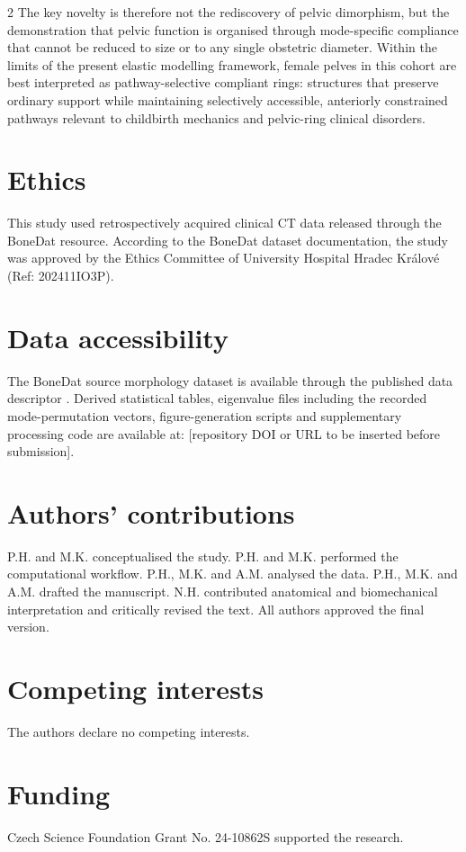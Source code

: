 \documentclass[openacc]{rsproca_new}
\begin{document}
\begin{multicols}{2}
The key novelty is therefore not the rediscovery of pelvic dimorphism, but the demonstration that pelvic function is organised through mode-specific compliance that cannot be reduced to size or to any single obstetric diameter. Within the limits of the present elastic modelling framework, female pelves in this cohort are best interpreted as pathway-selective compliant rings: structures that preserve ordinary support while maintaining selectively accessible, anteriorly constrained pathways relevant to childbirth mechanics and pelvic-ring clinical disorders.

\section*{Ethics}

This study used retrospectively acquired clinical CT data released through the BoneDat resource. According to the BoneDat dataset documentation, the study was approved by the Ethics Committee of University Hospital Hradec Kr\'{a}lov\'{e} (Ref: 202411IO3P).

\section*{Data accessibility}

The BoneDat source morphology dataset is available through the published data descriptor \cite{HenysKuchar2025}. Derived statistical tables, eigenvalue files including the recorded mode-permutation vectors, figure-generation scripts and supplementary processing code are available at: [repository DOI or URL to be inserted before submission].

\section*{Authors' contributions}

P.H. and M.K. conceptualised the study. P.H. and M.K. performed the computational workflow. P.H., M.K. and A.M. analysed the data. P.H., M.K. and A.M. drafted the manuscript. N.H. contributed anatomical and biomechanical interpretation and critically revised the text. All authors approved the final version.

\section*{Competing interests}

The authors declare no competing interests.

\section*{Funding}
Czech Science Foundation Grant No. 24-10862S supported the research.
\end{multicols}
\end{document}
